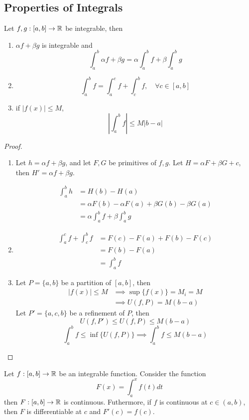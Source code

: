 \documentclass[a4paper,10pt]{article}
\begin{document}
\subsection{Properties of Integrals}

Let $f,g : [a,b] \to \mathbb{R}$ be integrable, then
\begin{enumerate}
	\item
		$\alpha f + \beta g$ is integrable and
		\[ \int_a^b \alpha f + \beta g = \alpha \int_a^b f + \beta \int_a^b g \]
	\item
		\[ \int_a^b f = \int_a^c f + \int_c^b f, \quad \forall c \in [a,b] \]
	\item
		if $|f(x)| \leq M$,
		\[ \left| \int_a^b f \right| \leq M |b-a| \]
\end{enumerate}

\begin{proof}
	\begin{enumerate}
		\item
			Let $h = \alpha f + \beta g$, and let $F,G$ be primitives of $f,g$.
			Let $H = \alpha F + \beta G + c$, then $H' = \alpha f + \beta g$.

			\begin{align*}
				\int_a^b h &= H(b) - H(a) \\
					   &= \alpha F(b) - \alpha F(a)
						+ \beta G(b) - \beta G(a) \\
					   &= \alpha \int_a^b f + \beta \int_a^b g
			\end{align*}
		\item
			\begin{align*}
				\int_a^c f + \int_c^b f &= F(c) - F(a) + F(b) - F(c) \\
							&= F(b) - F(a) \\
				   			&= \int_a^b f
			\end{align*}
		\item
			Let $P = \{a,b\}$ be a partition of $[a,b]$, then
			\begin{align*}
				|f(x)| \leq M &\implies \sup\{f(x)\} = M_i = M \\
					      &\implies U(f,P) = M(b-a)
			\end{align*}
			Let  $P' = \{a,c,b\}$ be a refinement of $P$, then
			\[ U(f,P') \leq U(f,P) \leq M(b-a) \]
			\[ \int_a^b f \leq \inf\{U(f,P)\} \implies \int_a^b f \leq M(b-a) \]
	\end{enumerate}
\end{proof}

\begin{thm}
	Let $f:[a,b] \to \mathbb{R}$ be an integrable function. Consider the function
	\[ F(x) = \int_a^x f(t) dt \]
	then $F:[a,b] \to \mathbb{R}$ is continuous. Futhermore, if $f$ is
	continuous at $c \in (a,b)$, then $F$ is differentiable at $c$
	and $F'(c) = f(c)$.
\end{thm}
\end{document}
